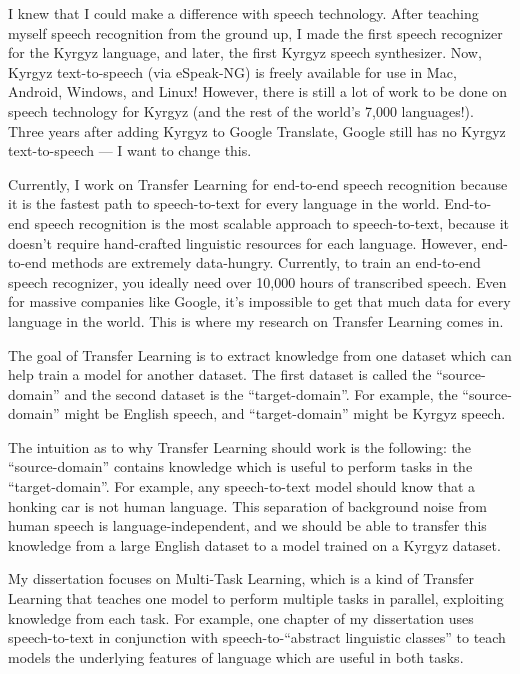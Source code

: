 \documentclass[12pt,a4paper]{article}
\begin{document}
I knew that I could make a difference with speech technology. After teaching myself speech recognition from the ground up, I made the first speech recognizer for the Kyrgyz language, and later, the first Kyrgyz speech synthesizer. Now, Kyrgyz text-to-speech (via eSpeak-NG) is freely available for use in Mac, Android, Windows, and Linux! However, there is still a lot of work to be done on speech technology for Kyrgyz (and the rest of the world's 7,000 languages!). Three years after adding Kyrgyz to Google Translate, Google still has no Kyrgyz text-to-speech --- I want to change this.

Currently, I work on Transfer Learning for end-to-end speech recognition because it is the fastest path to speech-to-text for every language in the world. End-to-end speech recognition is the most scalable approach to speech-to-text, because it doesn't require hand-crafted linguistic resources for each language. However, end-to-end methods are extremely data-hungry. Currently, to train an end-to-end speech recognizer, you ideally need over 10,000 hours of transcribed speech. Even for massive companies like Google, it's impossible to get that much data for every language in the world. This is where my research on Transfer Learning comes in.

The goal of Transfer Learning is to extract knowledge from one dataset which can help train a model for another dataset. The first dataset is called the ``source-domain'' and the second dataset is the ``target-domain''. For example, the ``source-domain'' might be English speech, and ``target-domain'' might be Kyrgyz speech.

The intuition as to why Transfer Learning should work is the following: the ``source-domain'' contains knowledge which is useful to perform tasks in the ``target-domain''. For example, any speech-to-text model should know that a honking car is not human language. This separation of background noise from human speech is language-independent, and we should be able to transfer this knowledge from a large English dataset to a model trained on a Kyrgyz dataset.

My dissertation focuses on Multi-Task Learning, which is a kind of Transfer Learning that teaches one model to perform multiple tasks in parallel, exploiting knowledge from each task. For example, one chapter of my dissertation uses speech-to-text in conjunction with speech-to-``abstract linguistic classes'' to teach models the underlying features of language which are useful in both tasks.
\end{document}
